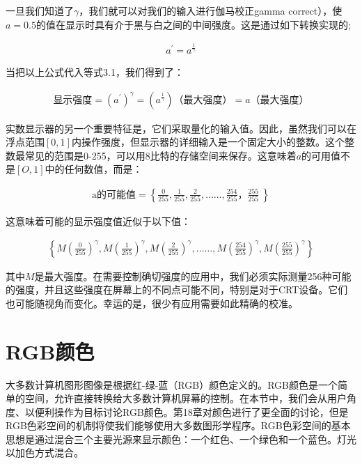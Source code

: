 \documentclass[lang=cn,12pt]{elegantbook}
\begin{document}
一旦我们知道了$\gamma$，我们就可以对我们的输入进行伽马校正gamma correct），使$a=0.5$的值在显示时具有介于黑与白之间的中间强度。这是通过如下转换实现的;

\[
  \begin{aligned}
  a^{'} = a^{\frac{1}{\gamma } }
  \end{aligned}
\]

当把以上公式代入等式3.1，我们得到了：

\[
  \begin{aligned}
  \mbox{显示强度} = (a^{'})^\gamma = (a^{\frac{1}{\gamma}})\mbox{（最大强度）} = a\mbox{（最大强度）}
  \end{aligned}
\]


实数显示器的另一个重要特征是，它们采取量化的输入值。因此，虽然我们可以在浮点范围$[0,1]$内操作强度，但显示器的详细输入是一个固定大小的整数。这个整数最常见的范围是0-255，可以用8比特的存储空间来保存。这意味着$a$的可用值不是$[O,1]$中的任何数值，而是：

\[
  \begin{aligned}
  \mbox{a的可能值} = \left\{ \frac{0}{255},\frac{1}{255},\frac{2}{255},……,\frac{254}{255}，\frac{255}{255}\ \right\}
  \end{aligned}
\]

这意味着可能的显示强度值近似于以下值：

\[
  \begin{aligned}
    \left\{ M(\frac{0}{255})^\gamma ,M(\frac{1}{255})^\gamma ,M(\frac{2}{255})^\gamma ,……,M(\frac{254}{255})^\gamma ,M(\frac{255}{255})^\gamma \right\}
  \end{aligned}
\]

其中$M$是最大强度。在需要控制确切强度的应用中，我们必须实际测量256种可能的强度，并且这些强度在屏幕上的不同点可能不同，特别是对于CRT设备。它们也可能随视角而变化。幸运的是，很少有应用需要如此精确的校准。

\section{RGB颜色}

大多数计算机图形图像是根据红-绿-蓝（RGB）颜色定义的。RGB颜色是一个简单的空间，允许直接转换给大多数计算机屏幕的控制。在本节中，我们会从用户角度、以便利操作为目标讨论RGB颜色。第18章对颜色进行了更全面的讨论，但是RGB色彩空间的机制将使我们能够使用大多数图形学程序。RGB色彩空间的基本思想是通过混合三个主要光源来显示颜色：一个红色、一个绿色和一个蓝色。灯光以加色方式混合。
\end{document}
